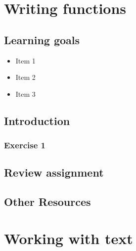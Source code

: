 \documentclass[
]{book}
\providecommand{\tightlist}{%
  \setlength{\itemsep}{0pt}\setlength{\parskip}{0pt}}
\begin{document}
\hypertarget{writing-functions}{%
\chapter{Writing functions}\label{writing-functions}}

\hypertarget{learning-goals-6}{%
\section*{Learning goals}\label{learning-goals-6}}

\begin{itemize}
\tightlist
\item
  Item 1\\
\item
  Item 2\\
\item
  Item 3
\end{itemize}

\hypertarget{introduction-1}{%
\section*{Introduction}\label{introduction-1}}

\hypertarget{exercise-1-5}{%
\subsection*{Exercise 1}\label{exercise-1-5}}

\hypertarget{review-assignment-6}{%
\section*{Review assignment}\label{review-assignment-6}}

\hypertarget{other-resources-5}{%
\section*{Other Resources}\label{other-resources-5}}

\hypertarget{working-with-text}{%
\chapter{Working with text}\label{working-with-text}}
\end{document}
